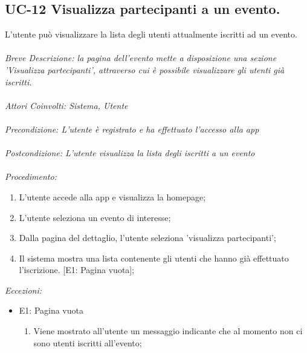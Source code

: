 \subsection{UC-12 Visualizza partecipanti a un evento.}
L'utente può visualizzare la lista degli utenti attualmente iscritti ad un evento.
\\
\\
\textit{Breve Descrizione: la pagina dell'evento mette a disposizione una sezione 'Visualizza partecipanti', attraverso cui è possibile visualizzare gli utenti già iscritti.} 
\\
\\
\textit{Attori Coinvolti: Sistema, Utente}
\\
\\
\textit{Precondizione: L'utente è registrato e ha effettuato l'accesso alla app}
\\
\\
\textit{Postcondizione: L'utente visualizza la lista degli iscritti a un evento}
\\
\\
\textit{Procedimento:}
\begin{enumerate}
	\item L'utente accede alla app e visualizza la homepage;
	\item L'utente seleziona un evento di interesse;
	\item Dalla pagina del dettaglio, l'utente seleziona 'visualizza partecipanti';
	\item Il sistema mostra una lista contenente gli utenti che hanno già effettuato l'iscrizione. [E1: Pagina vuota];
\end{enumerate}


\textit{Eccezioni:}
\begin{itemize}
	\item E1: Pagina vuota
	\begin{enumerate}
		\item Viene mostrato all'utente un messaggio indicante che al momento non ci sono utenti iscritti all'evento;
	\end{enumerate}
\end{itemize}
